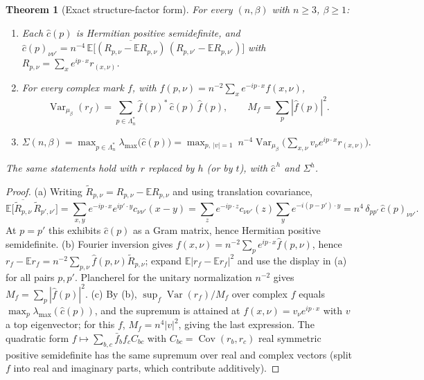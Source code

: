 \documentclass[11pt]{article}
\newtheorem{theorem}{Theorem}[section]
\theoremstyle{definition}
\newcommand{\E}{\mathbb{E}}
\newcommand{\Var}{\operatorname{Var}}
\newcommand{\Cov}{\operatorname{Cov}}
\newcommand{\lam}{\lambda_{\max}}
\begin{document}
\begin{theorem}[Exact structure-factor form]\label{thm:symbol}
For every $(n,\beta)$ with $n\ge3$, $\beta\ge1$:
\begin{enumerate}
\item[(a)] Each $\hat c(p)$ is Hermitian positive semidefinite, and
$\hat c(p)_{\nu\nu'}=n^{-4}\,\E\big[\overline{(R_{p,\nu}-\E R_{p,\nu})}\,(R_{p,\nu'}-\E R_{p,\nu'})\big]$ with
$R_{p,\nu}=\sum_{x}e^{ip\cdot x}r_{(x,\nu)}$.
\item[(b)] For every complex mark $f$, with $\hat f(p,\nu)=n^{-2}\sum_xe^{-ip\cdot x}f(x,\nu)$,
\[
\Var_{\mu_\beta}(r_f)=\sum_{p\in\Lambda_n^*}\hat f(p)^*\,\hat c(p)\,\hat f(p),\qquad M_f=\sum_p|\hat f(p)|^2 .
\]
\item[(c)] $\displaystyle \Sigma(n,\beta)=\max_{p\in\Lambda_n^*}\lam\big(\hat c(p)\big)
=\max_{p,\ |v|=1}\ n^{-4}\Var_{\mu_\beta}\Big(\sum_{x,\nu}v_\nu e^{ip\cdot x}r_{(x,\nu)}\Big).$
\end{enumerate}
The same statements hold with $r$ replaced by $h$ (or by $t$), with $\hat c^{\,h}$ and $\Sigma^h$.
\end{theorem}
\begin{proof}
(a) Writing $\tilde R_{p,\nu}=R_{p,\nu}-\E R_{p,\nu}$ and using translation covariance,
\[
\E\big[\overline{\tilde R_{p,\nu}}\,\tilde R_{p',\nu'}\big]=\sum_{x,y}e^{-ip\cdot x}e^{ip'\cdot y}c_{\nu\nu'}(x-y)
=\sum_ze^{-ip\cdot z}c_{\nu\nu'}(z)\sum_ye^{-i(p-p')\cdot y}=n^4\,\delta_{pp'}\,\hat c(p)_{\nu\nu'} .
\]
At $p=p'$ this exhibits $\hat c(p)$ as a Gram matrix, hence Hermitian positive semidefinite.
(b) Fourier inversion gives $f(x,\nu)=n^{-2}\sum_pe^{ip\cdot x}\hat f(p,\nu)$, hence
$r_f-\E r_f=n^{-2}\sum_{p,\nu}\hat f(p,\nu)\tilde R_{p,\nu}$; expand $\E|r_f-\E r_f|^2$ and use the
display in (a) for all pairs $p,p'$. Plancherel for the unitary normalization $n^{-2}$ gives $M_f=\sum_p|\hat f(p)|^2$.
(c) By (b), $\sup_f\Var(r_f)/M_f$ over complex $f$ equals $\max_p\lam(\hat c(p))$, and the supremum is attained at
$f(x,\nu)=v_\nu e^{ip\cdot x}$ with $v$ a top eigenvector; for this $f$, $M_f=n^4|v|^2$, giving the last expression. The quadratic form
$f\mapsto\sum_{b,c}\bar f_bf_cC_{bc}$ with $C_{bc}=\Cov(r_b,r_c)$ real symmetric positive semidefinite has the same
supremum over real and complex vectors (split $f$ into real and imaginary parts, which contribute additively).
\end{proof}
\end{document}
